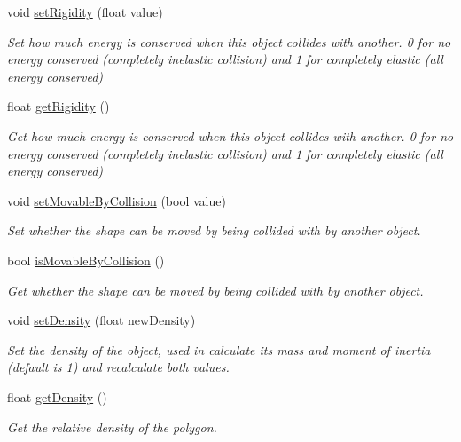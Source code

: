 \begin{DoxyCompactItemize}
void \mbox{\hyperlink{class_polygon_a5325135466047ff1a8bb215905c54c83}{set\+Rigidity}} (float value)
\begin{DoxyCompactList}\small\item\em Set how much energy is conserved when this object collides with another. 0 for no energy conserved (completely inelastic collision) and 1 for completely elastic (all energy conserved) \end{DoxyCompactList}\item 
float \mbox{\hyperlink{class_polygon_a435f03ba82088fbde142d21950cfa1f3}{get\+Rigidity}} ()
\begin{DoxyCompactList}\small\item\em Get how much energy is conserved when this object collides with another. 0 for no energy conserved (completely inelastic collision) and 1 for completely elastic (all energy conserved) \end{DoxyCompactList}\item 
void \mbox{\hyperlink{class_polygon_ac379bd1b47a91b062cb1489f4be11b2e}{set\+Movable\+By\+Collision}} (bool value)
\begin{DoxyCompactList}\small\item\em Set whether the shape can be moved by being collided with by another object. \end{DoxyCompactList}\item 
bool \mbox{\hyperlink{class_polygon_a83af7b70f89b8b27f5dc78f27dcd60d7}{is\+Movable\+By\+Collision}} ()
\begin{DoxyCompactList}\small\item\em Get whether the shape can be moved by being collided with by another object. \end{DoxyCompactList}\item 
void \mbox{\hyperlink{class_polygon_a21749fb83e0fa8fd98cf646e0e4cbadc}{set\+Density}} (float new\+Density)
\begin{DoxyCompactList}\small\item\em Set the density of the object, used in calculate its mass and moment of inertia (default is 1) and recalculate both values. \end{DoxyCompactList}\item 
float \mbox{\hyperlink{class_polygon_a93f38d702fe7c95af0ac72910c00908e}{get\+Density}} ()
\begin{DoxyCompactList}\small\item\em Get the relative density of the polygon. \end{DoxyCompactList}\item 

\end{DoxyCompactItemize}

